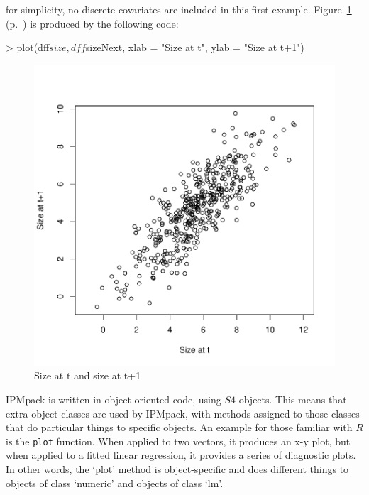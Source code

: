 \documentclass{article}
\begin{document}
for simplicity, no discrete covariates are included in this first example. Figure~\ref{fig:zero} (p.~\pageref{fig:zero}) is produced by the following code:

\begin{Schunk}
\begin{Sinput}
> plot(dff$size, dff$sizeNext, xlab = "Size at t", ylab = "Size at t+1")
\end{Sinput}
\end{Schunk}
\begin{figure}
\begin{center}
\includegraphics{IPMpack_vignette-fig0}
\end{center}
\caption{Size at t and size at t+1}
\label{fig:zero}
\end{figure}

IPMpack is written in object-oriented code, using $S4$ objects. This means that
extra object classes are used by IPMpack, with methods assigned to those classes
that do particular things to specific objects. An example for those familiar
with $R$ is the {\tt plot} function. When applied to two vectors, it produces an x-y plot, but when applied to a fitted linear regression, it provides a series of diagnostic plots. In other words, the `plot' method is object-specific and does different things to objects of class `numeric' and objects of class `lm'.
\end{document}
